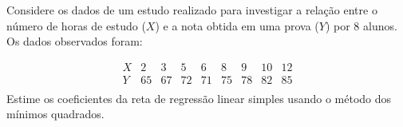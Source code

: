 %
%


\begin{exercicioBanco}[\valorquestao]
    Considere os dados de um estudo realizado para investigar a relação entre o número de horas de estudo ($X$) e a nota obtida em uma prova ($Y$) por 8 alunos. Os dados observados foram:

    \[
    \begin{array}{c|cccccccc}
        X & 2 & 3 & 5 & 6 & 8 & 9 & 10 & 12 \\
        \hline
        Y & 65 & 67 & 72 & 71 & 75 & 78 & 82 & 85 \\
    \end{array}
    \]
Estime os coeficientes da reta de regressão linear simples usando o método dos mínimos quadrados.
\end{exercicioBanco}

